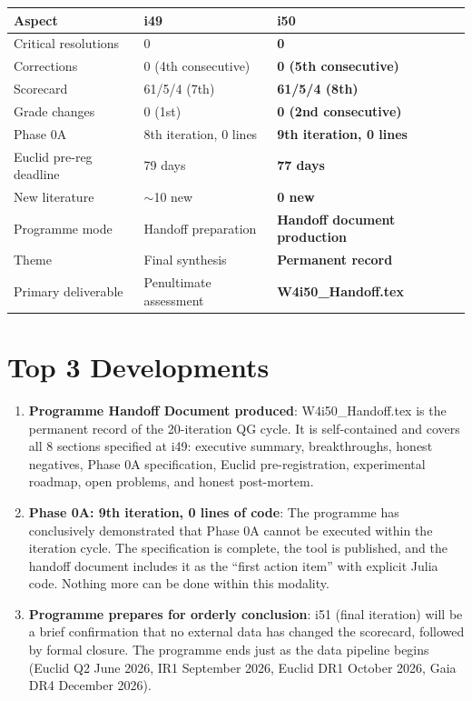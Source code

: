 \documentclass[11pt,a4paper]{article}
\begin{document}
\begin{center}
\begin{tabular}{lll}
\toprule
\textbf{Aspect} & \textbf{i49} & \textbf{i50} \\
\midrule
Critical resolutions & 0 & \textbf{0} \\
Corrections & 0 (4th consecutive) & \textbf{0 (5th consecutive)} \\
Scorecard & 61/5/4 (7th) & \textbf{61/5/4 (8th)} \\
Grade changes & 0 (1st) & \textbf{0 (2nd consecutive)} \\
Phase 0A & 8th iteration, 0 lines & \textbf{9th iteration, 0 lines} \\
Euclid pre-reg deadline & 79 days & \textbf{77 days} \\
New literature & $\sim$10 new & \textbf{0 new} \\
Programme mode & Handoff preparation & \textbf{Handoff document production} \\
Theme & Final synthesis & \textbf{Permanent record} \\
Primary deliverable & Penultimate assessment & \textbf{W4i50\_Handoff.tex} \\
\bottomrule
\end{tabular}
\end{center}

\section{Top 3 Developments}

\begin{enumerate}
\item \textbf{Programme Handoff Document produced}: W4i50\_Handoff.tex is the permanent record of the 20-iteration QG cycle. It is self-contained and covers all 8 sections specified at i49: executive summary, breakthroughs, honest negatives, Phase 0A specification, Euclid pre-registration, experimental roadmap, open problems, and honest post-mortem.

\item \textbf{Phase 0A: 9th iteration, 0 lines of code}: The programme has conclusively demonstrated that Phase 0A cannot be executed within the iteration cycle. The specification is complete, the tool is published, and the handoff document includes it as the ``first action item'' with explicit Julia code. Nothing more can be done within this modality.

\item \textbf{Programme prepares for orderly conclusion}: i51 (final iteration) will be a brief confirmation that no external data has changed the scorecard, followed by formal closure. The programme ends just as the data pipeline begins (Euclid Q2 June 2026, IR1 September 2026, Euclid DR1 October 2026, Gaia DR4 December 2026).
\end{enumerate}
\end{document}
